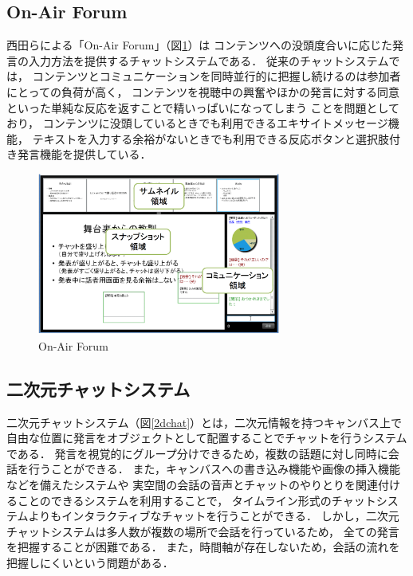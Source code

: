 \subsection{On-Air Forum}

西田らによる「On-Air Forum\cite{nishida2011}」（図\ref{onairforum}）は
コンテンツへの没頭度合いに応じた発言の入力方法を提供するチャットシステムである．
従来のチャットシステムでは，
コンテンツとコミュニケーションを同時並行的に把握し続けるのは参加者にとっての負荷が高く，
コンテンツを視聴中の興奮やほかの発言に対する同意といった単純な反応を返すことで精いっぱいになってしまう
ことを問題としており，
コンテンツに没頭しているときでも利用できるエキサイトメッセージ機能，
テキストを入力する余裕がないときでも利用できる反応ボタンと選択肢付き発言機能を提供している．

\begin{figure}[H]
\centering
\includegraphics[width=8cm]{images/onairforum.png}
\caption{On-Air Forum}
\label{onairforum}
\end{figure}

\subsection{二次元チャットシステム}

二次元チャットシステム（図\ref{2dchat}）とは，二次元情報を持つキャンバス上で
自由な位置に発言をオブジェクトとして配置することでチャットを行うシステムである．
発言を視覚的にグループ分けできるため，複数の話題に対し同時に会話を行うことができる．
また，キャンバスへの書き込み機能や画像の挿入機能などを備えたシステム\cite{kazama}や
実空間の会話の音声とチャットのやりとりを関連付けることのできるシステム\cite{110002711453}を利用することで，
タイムライン形式のチャットシステムよりもインタラクティブなチャットを行うことができる．
しかし，二次元チャットシステムは多人数が複数の場所で会話を行っているため，
全ての発言を把握することが困難である．
また，時間軸が存在しないため，会話の流れを把握しにくいという問題がある．

